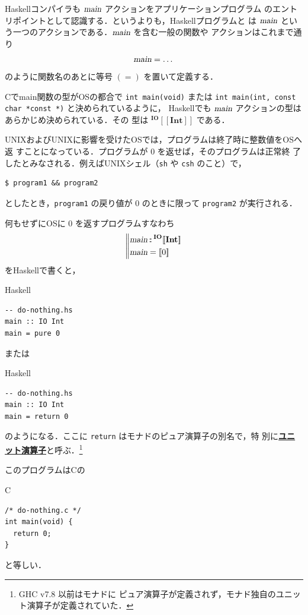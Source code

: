 \documentclass[a5paper,twoside,fleqn,draft]{jsbook}
\def\[{[\![}
\def\]{]\!]}
\newcommand{\programminglanguage}[1]{\textsf{#1}}
\newcommand{\clang}{\programminglanguage{C}}
\newcommand{\haskell}{\programminglanguage{Haskell}}
\newcommand{\keyword}[1]{{\underline{\textbf{#1}}}}
\newcommand{\code}[1]{\texttt{#1}}
\newcommand{\filename}[1]{\texttt{#1}}
\newenvironment{ccode}{\begin{itembox}[r]{\clang}}{\end{itembox}}
\newenvironment{haskellcode}{\begin{itembox}[r]{\haskell}}{\end{itembox}}
\newcommand{\mBrace}{\Vert}
\newcommand{\mAction}[1]{\textsl{#1}}
\DeclareMathOperator{\mMain}{\mAction{main}}
\DeclareMathOperator{\mIn}{{:\!:}}
\newcommand{\mType}[1]{\mathbf{#1}} %
\newcommand{\mIntType}{\mType{Int}}
\newcommand{\mTypeAssemble}[2]{{}^\mType{#1}\[\mType{#2}\]}
\newcommand{\mIOType}[1]{\mTypeAssemble{IO}{#1}}
\newcommand{\mIOIntType}{\mIOType{\mIntType}}
\newcommand{\mPureWith}[1]{\[#1\]}
\begin{document}
\haskell コンパイラも $\mMain$ アクションをアプリケーションプログラム
のエントリポイントとして認識する．というよりも，\haskell プログラムと
は $\mMain$ という一つのアクションである．$\mMain$ を含む一般の関数や
アクションはこれまで通り
\begin{equation}
\mMain=\dots
\end{equation}
のように関数名のあとに等号 $(=)$ を置いて定義する．

\clang でmain関数の型がOSの都合で \code{int main(void)} または
\code{int main(int, const char *const *)} と決められているように，
\haskell でも $\mMain$ アクションの型はあらかじめ決められている．その
型は $\mIOIntType$ である．

UNIXおよびUNIXに影響を受けたOSでは，プログラムは終了時に整数値をOSへ返
すことになっている．プログラムが $0$ を返せば，そのプログラムは正常終
了したとみなされる．例えばUNIXシェル（\filename{sh} や \filename{csh}
  のこと）で，
\begin{verbatim}
$ program1 && program2
\end{verbatim}
としたとき，\filename{program1} の戻り値が $0$ のときに限って
\filename{program2} が実行される．

何もせずにOSに $0$ を返すプログラムすなわち
\begin{equation}
\left\mBrace
\begin{aligned}
\mMain&\mIn{}\mIOIntType\\
\mMain&=\mPureWith{0}
\end{aligned}
\right.
\end{equation}
を\haskell で書くと，
\begin{haskellcode}
\begin{verbatim}
-- do-nothing.hs
main :: IO Int
main = pure 0
\end{verbatim}
\end{haskellcode}
または
\begin{haskellcode}
\begin{verbatim}
-- do-nothing.hs
main :: IO Int
main = return 0
\end{verbatim}
\end{haskellcode}
のようになる．ここに \code{return} はモナドのピュア演算子の別名で，特
別に\keyword{ユニット演算子}と呼ぶ．\footnote{GHC v7.8 以前はモナドに
  ピュア演算子が定義されず，モナド独自のユニット演算子が定義されていた．}

このプログラムは\clang の
\begin{ccode}
\begin{verbatim}
/* do-nothing.c */
int main(void) {
  return 0;
}
\end{verbatim}
\end{ccode}
と等しい．
\end{document}
